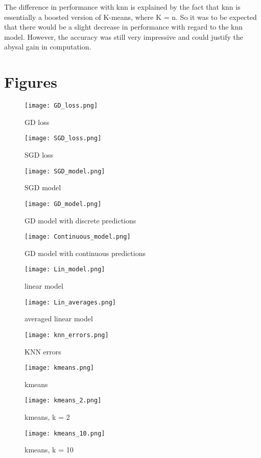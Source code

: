 \documentclass{article}
\begin{document}
The difference in performance with knn is explained by the fact that knn is essentially a boosted version of K-means, where K = n. So it was to be expected that there would be a slight decrease in performance with regard to the knn model. However, the accuracy was still very impressive and could justify the abysal gain in computation.

\section{Figures}

\begin{figure}[h]
\centering
\texttt{[image: GD\_loss.png]}
\caption{GD loss}
\end{figure}

\begin{figure}[h]
\centering
\texttt{[image: SGD\_loss.png]}
\caption{SGD loss}
\end{figure}

\begin{figure}[h]
\centering
\texttt{[image: SGD\_model.png]}
\caption{SGD model}
\end{figure}

\begin{figure}[h]
\centering
\texttt{[image: GD\_model.png]}
\caption{GD model with discrete predictions}
\end{figure}

\begin{figure}[h]
\centering
\texttt{[image: Continuous\_model.png]}
\caption{GD model with continuous predictions}
\end{figure}

\begin{figure}[h]
\centering
\texttt{[image: Lin\_model.png]}
\caption{linear model}
\end{figure}

\begin{figure}[h]
\centering
\texttt{[image: Lin\_averages.png]}
\caption{averaged linear model}
\end{figure}

\begin{figure}[h]
\centering
\texttt{[image: knn\_errors.png]}
\caption{KNN errors}
\end{figure}

\begin{figure}[h]
\centering
\texttt{[image: kmeans.png]}
\caption{kmeans}
\end{figure}

\begin{figure}[h]
\centering
\texttt{[image: kmeans\_2.png]}
\caption{kmeans, k = 2}
\end{figure}

\begin{figure}[h]
\centering
\texttt{[image: kmeans\_10.png]}
\caption{kmeans, k = 10}
\end{figure}
\end{document}
